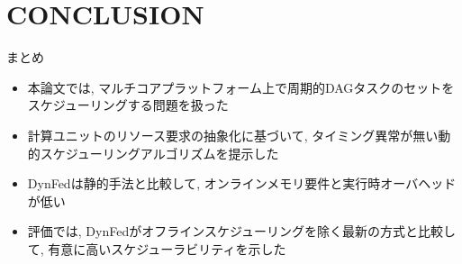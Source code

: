 
\section{CONCLUSION}
\label{sec: conclusion}

\begin{frame}{まとめ}
    \begin{itemize}
        \item 本論文では, マルチコアプラットフォーム上で周期的DAGタスクのセットをスケジューリングする問題を扱った
        \item 計算ユニットのリソース要求の抽象化に基づいて, タイミング異常が無い動的スケジューリングアルゴリズムを提示した
        \item DynFedは静的手法と比較して, オンラインメモリ要件と実行時オーバヘッドが低い
        \item 評価では, DynFedがオフラインスケジューリングを除く最新の方式と比較して, 有意に高いスケジューラビリティを示した
    \end{itemize}
\end{frame}
